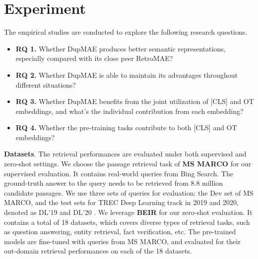 \documentclass[11pt,a4paper]{article}
\begin{document}
\section{Experiment}
The empirical studies are conducted to explore the following research questions. 
\begin{itemize}
    \item \textbf{RQ 1.} Whether DupMAE produces better semantic representations, especially compared with its close peer RetroMAE?
    \item \textbf{RQ 2.} Whether DupMAE is able to maintain its advantages throughout different situations?
    \item \textbf{RQ 3.} Whether DupMAE benefits from the joint utilization of [CLS] and OT embeddings, and what's the individual contribution from each embedding?
    \item \textbf{RQ 4.} Whether the pre-training tasks contribute to both [CLS] and OT embeddings?
\end{itemize}


\textbf{Datasets}. The retrieval performances are evaluated under both supervised and zero-shot settings. We choose the passage retrieval task of \textbf{MS MARCO} \cite{nguyen2016ms} for our supervised evaluation. It contains real-world queries from Bing Search. The ground-truth answer to the query needs to be retrieved from 8.8 million candidate passages. We use three sets of queries for evaluation: the Dev set of MS MARCO, and the test sets for TREC Deep Learning track in 2019 and 2020, denoted as DL'19 and DL'20 \cite{craswell2020overview}. We leverage \textbf{BEIR} \cite{thakur2021beir} for our zero-shot evaluation. It contains a total of 18 datasets, which covers diverse types of retrieval tasks, such as question answering, entity retrieval, fact verification, etc. The pre-trained models are fine-tuned with queries from MS MARCO, and evaluated for their out-domain retrieval performances on each of the 18 datasets. 
\end{document}
